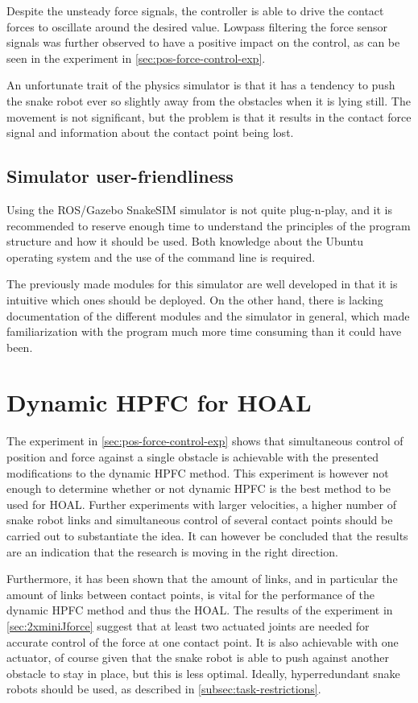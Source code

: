 Despite the unsteady force signals, the controller is able to drive the contact forces to oscillate around the desired value. Lowpass filtering the force sensor signals was further observed to have a positive impact on the control, as can be seen in the experiment in \ref{sec:pos-force-control-exp}.

An unfortunate trait of the physics simulator is that it has a tendency to push the snake robot ever so slightly away from the obstacles when it is lying still. The movement is not significant, but the problem is that it results in the contact force signal and information about the contact point being lost.

\subsection{Simulator user-friendliness}

Using the ROS/Gazebo SnakeSIM simulator is not quite plug-n-play, and it is recommended to reserve enough time to understand the principles of the program structure and how it should be used. Both knowledge about the Ubuntu operating system and the use of the command line is required.

The previously made modules for this simulator are well developed in that it is intuitive which ones should be deployed. On the other hand, there is lacking documentation of the different modules and the simulator in general, which made familiarization with the program much more time consuming than it could have been.

\section{Dynamic HPFC for HOAL}

The experiment in \ref{sec:pos-force-control-exp} shows that simultaneous control of position and force against a single obstacle is achievable with the presented modifications to the dynamic HPFC method. This experiment is however not enough to determine whether or not dynamic HPFC is the best method to be used for HOAL. Further experiments with larger velocities, a higher number of snake robot links and simultaneous control of several contact points should be carried out to substantiate the idea. It can however be concluded that the results are an indication that the research is moving in the right direction.

Furthermore, it has been shown that the amount of links, and in particular the amount of links between contact points, is vital for the performance of the dynamic HPFC method and thus the HOAL. The results of the experiment in \ref{sec:2xminiJforce} suggest that at least two actuated joints are needed for accurate control of the force at one contact point. It is also achievable with one actuator, of course given that the snake robot is able to push against another obstacle to stay in place, but this is less optimal. Ideally, hyperredundant snake robots should be used, as described in \ref{subsec:task-restrictions}.

